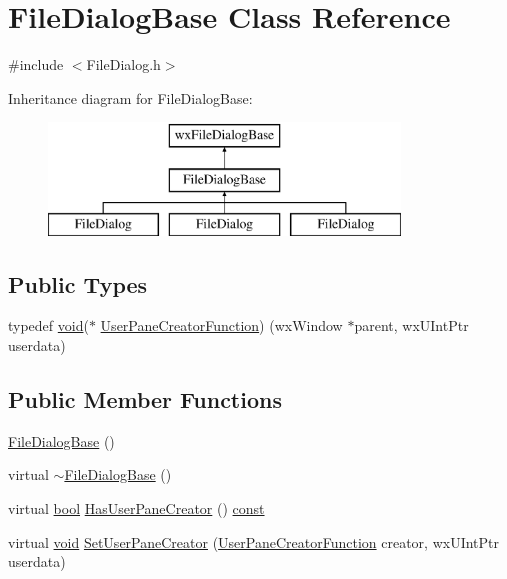 \hypertarget{class_file_dialog_base}{}\section{File\+Dialog\+Base Class Reference}
\label{class_file_dialog_base}


{\ttfamily \#include $<$File\+Dialog.\+h$>$}

Inheritance diagram for File\+Dialog\+Base\+:\begin{figure}[H]
\begin{center}
\leavevmode
\includegraphics[height=3.000000cm]{class_file_dialog_base}
\end{center}
\end{figure}
\subsection*{Public Types}
\begin{DoxyCompactItemize}
\item 
typedef \hyperlink{sound_8c_ae35f5844602719cf66324f4de2a658b3}{void}($\ast$ \hyperlink{class_file_dialog_base_a40a1c0cab71c92fb6b84b2d49dbf86a6}{User\+Pane\+Creator\+Function}) (wx\+Window $\ast$parent, wx\+U\+Int\+Ptr userdata)
\end{DoxyCompactItemize}
\subsection*{Public Member Functions}
\begin{DoxyCompactItemize}
\item 
\hyperlink{class_file_dialog_base_a97b9a8c1394635a01fb920ff3e236ab0}{File\+Dialog\+Base} ()
\item 
virtual \hyperlink{class_file_dialog_base_ae5123e1147ecc40d1777e14f4174c550}{$\sim$\+File\+Dialog\+Base} ()
\item 
virtual \hyperlink{mac_2config_2i386_2lib-src_2libsoxr_2soxr-config_8h_abb452686968e48b67397da5f97445f5b}{bool} \hyperlink{class_file_dialog_base_a504d84b1850a2775b2c4c7e09e56aa70}{Has\+User\+Pane\+Creator} () \hyperlink{getopt1_8c_a2c212835823e3c54a8ab6d95c652660e}{const} 
\item 
virtual \hyperlink{sound_8c_ae35f5844602719cf66324f4de2a658b3}{void} \hyperlink{class_file_dialog_base_a6961ee89579c6b71cc9e42aecd6c4de5}{Set\+User\+Pane\+Creator} (\hyperlink{class_file_dialog_base_a40a1c0cab71c92fb6b84b2d49dbf86a6}{User\+Pane\+Creator\+Function} creator, wx\+U\+Int\+Ptr userdata)
\end{DoxyCompactItemize}
